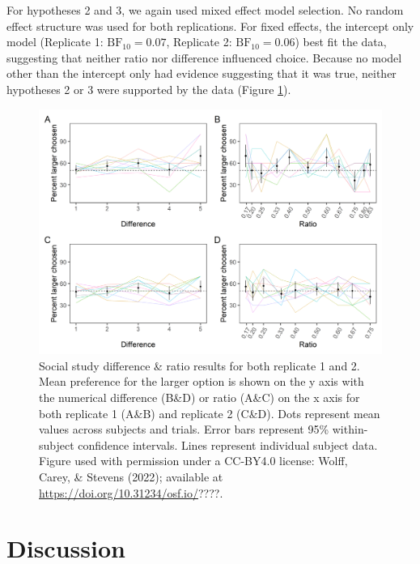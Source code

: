 \documentclass[
  ,doc,floatsintext]{apa6}
\begin{document}
For hypotheses 2 and 3, we again used mixed effect model selection. No random effect structure was used for both replications. For fixed effects, the intercept only model (Replicate 1: \(\mathrm{BF}_{\textrm{10}} = 0.07\), Replicate 2: \(\mathrm{BF}_{\textrm{10}} = 0.06\)) best fit the data, suggesting that neither ratio nor difference influenced choice. Because no model other than the intercept only had evidence suggesting that it was true, neither hypotheses 2 or 3 were supported by the data (Figure \ref{fig:socialgraphs}).



\begin{figure}

{\centering \includegraphics[width=1\linewidth]{../figures/social_figure} 

}

\caption{Social study difference \& ratio results for both replicate 1 and 2. Mean preference for the larger option is shown on the y axis with the numerical difference (B\&D) or ratio (A\&C) on the x axis for both replicate 1 (A\&B) and replicate 2 (C\&D). Dots represent mean values across subjects and trials. Error bars represent 95\% within-subject confidence intervals. Lines represent individual subject data. Figure used with permission under a CC-BY4.0 license: Wolff, Carey, \& Stevens (2022); available at \url{https://doi.org/10.31234/osf.io/}????.}\label{fig:socialgraphs}
\end{figure}

\hypertarget{discussion}{%
\section{Discussion}\label{discussion}}
\end{document}
